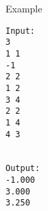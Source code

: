 Example  
\begin{verbatim}
Input:
3
1 1
-1
2 2
1 2
3 4
2 2
1 4
4 3


Output:
-1.000
3.000
3.250
\end{verbatim}